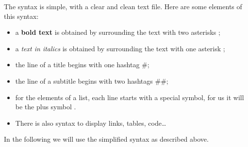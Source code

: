 \documentclass[11pt,class=report,crop=false]{standalone}
\begin{document}
\begin{cours}[Markdown]
The syntax is simple, with a clear and clean text file. Here are some elements of this syntax:
\begin{itemize}
  \item a \textbf{bold text} is obtained by surrounding the text with two asterisks \ci{**};
  \item a \emph{text in italics} is obtained by surrounding the text with one asterisk \ci{*};
  \item the line of a title begins with one hashtag \#;
  \item the line of a subtitle begins with two hashtags \#\#;
  \item for the elements of a list, each line starts with a special symbol, for us it will be the \og{}plus\fg{} symbol \ci{+}.
  \item There is also syntax to display links, tables, code\ldots 
\end{itemize}

In the following we will use the simplified syntax as described above.
\end{cours}

\end{document}
